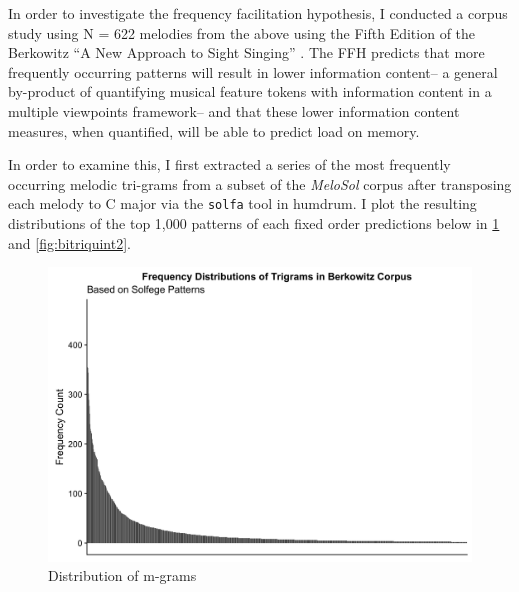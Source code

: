 \documentclass[12pt,]{book}
\begin{document}
In order to investigate the frequency facilitation hypothesis, I conducted a corpus study using N = 622 melodies from the above using the Fifth Edition of the Berkowitz ``A New Approach to Sight Singing'' \citep{berkowitzNewApproachSight2011}.
The FFH predicts that more frequently occurring patterns will result in lower information content-- a general by-product of quantifying musical feature tokens with information content in a multiple viewpoints framework-- and that these lower information content measures, when quantified, will be able to predict load on memory.

In order to examine this, I first extracted a series of the most frequently occurring melodic tri-grams from a subset of the \emph{MeloSol} corpus after transposing each melody to C major via the \texttt{solfa} tool in humdrum.
I plot the resulting distributions of the top 1,000 patterns of each fixed order predictions below in \ref{fig:bitriquint} and \ref{fig:bitriquint2}.

\begin{figure}

{\centering \includegraphics[width=1\linewidth]{img/trigrams} 

}

\caption{Distribution of m-grams}\label{fig:bitriquint}
\end{figure}
\end{document}
